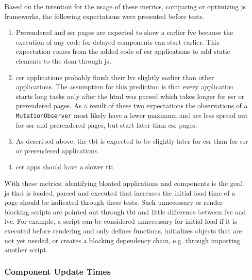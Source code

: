 \documentclass[a4paper, 12pt]{article}
\begin{document}
Based on the intention for the usage of these metrics, comparing or optimizing \acrlong{js} frameworks, the following expectations were presented before tests.
\begin{enumerate}
  \item Prerendered and \acrshort{ssr} pages are expected to show a earlier \acrshort{fvc} because the execution of any code for delayed components can start earlier.
  This expectation comes from the added code of \acrshort{csr} applications to add static elements to the \acrshort{dom} through \acrshort{js}.
  \item \acrshort{csr} applications probably finish their \acrshort{lvc} slightly earlier than other applications.
  The assumption for this prediction is that every application starts long tasks only after the \acrshort{html} was parsed which takes longer for \acrshort{ssr} or prerendered pages.
  As a result of these two expectations the observations of a \verb|MutationObserver| most likely have a lower maximum and are less spread out for \acrshort{ssr} and prerendered pages, but start later than \acrshort{csr} pages.
  \item As described above, the \acrshort{tbt} is expected to be slightly later for \acrshort{csr} than for \acrshort{ssr} or prerendered applications.
  \item \acrshort{csr} apps should have a slower \acrshort{tti}.
\end{enumerate}

With these metrics, identifying bloated applications and components is the goal.
\acrlong{js} that is loaded, parsed and executed that increases the initial load time of a page should be indicated through these tests.
Such unnecessary or render-blocking scripts are pointed out through \acrshort{tbt} and little difference between \acrshort{fvc} and \acrshort{lvc}.
For example, a script can be considered unnecessary for initial load if it is executed before rendering and only defines functions, initializes objects that are not yet needed, or creates a blocking dependency chain, e.g. through importing another script.

\subsubsection{Component Update Times}\label{subsub:componentUpdateTimes}
% 
\end{document}
